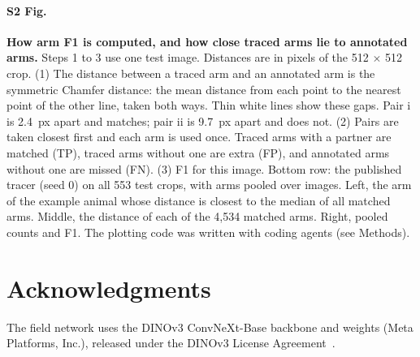 \paragraph*{S2 Fig.}
\label{S2_Fig}
{\bf How arm F1 is computed, and how close traced arms lie to annotated arms.} Steps 1 to 3 use one test image. Distances are in pixels of the 512 $\times$ 512 crop.
(1) The distance between a traced arm and an annotated arm is the symmetric Chamfer distance: the mean distance from each point to the nearest point of the other line, taken both ways. Thin white lines show these gaps. Pair i is 2.4~px apart and matches; pair ii is 9.7~px apart and does not.
(2) Pairs are taken closest first and each arm is used once. Traced arms with a partner are matched (TP), traced arms without one are extra (FP), and annotated arms without one are missed (FN).
(3) F1 for this image.
Bottom row: the published tracer (seed 0) on all 553 test crops, with arms pooled over images. Left, the arm of the example animal whose distance is closest to the median of all matched arms. Middle, the distance of each of the 4,534 matched arms. Right, pooled counts and F1. The plotting code was written with coding agents (see Methods).

\section*{Acknowledgments}

The field network uses the DINOv3 ConvNeXt-Base backbone and weights (Meta Platforms, Inc.), released under the DINOv3 License Agreement~\cite{simeoni2025dinov3}.
